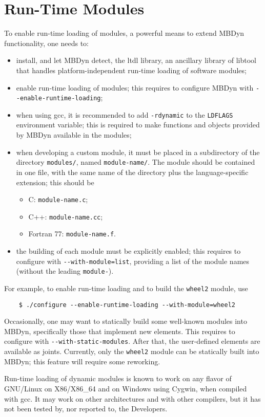 \documentclass[10pt,dvips]{report}
\newcommand{\kw}[1]{\texttt{#1}}
\begin{document}
\section{Run-Time Modules}
To enable run-time loading of modules, a powerful means to extend
MBDyn functionality, one needs to:
\begin{itemize}
\item install, and let MBDyn detect, the ltdl library, an ancillary
library of libtool that handles platform-independent run-time loading
of software modules;
\item enable run-time loading of modules; this requires to configure
MBDyn with \kw{{-}{-}enable-runtime-loading};
\item when using gcc, it is recommended to add \kw{-rdynamic} to
the \kw{LDFLAGS} environment variable; this is required to make
functions and objects provided by MBDyn available in the modules;
\item when developing a custom module, it must be placed in a subdirectory
of the directory \kw{modules/}, named \kw{module-name/}.
The module should be contained in one file, with the same name
of the directory plus the language-specific extension; this should be
	\begin{itemize}
	\item C: \kw{module-name.c};
	\item C++: \kw{module-name.cc};
	\item Fortran 77: \kw{module-name.f}.
\end{itemize}
\item the building of each module must be explicitly enabled;
this requires to configure with \kw{{-}{-}with-module=list},
providing a list of the module names (without the leading \kw{module-}).
\end{itemize}
For example, to enable run-time loading and to build the \kw{wheel2} module,
use
\begin{verbatim}
    $ ./configure --enable-runtime-loading --with-module=wheel2
\end{verbatim}
Occasionally, one may want to statically build some well-known modules
into MBDyn, specifically those that implement new elements.
This requires to configure with \kw{{-}{-}with-static-modules}.
After that, the user-defined elements are available as joints.
Currently, only the \kw{wheel2} module can be statically built
into MBDyn; this feature will require some reworking.

Run-time loading of dynamic modules is known to work on any flavor
of GNU/Linux on X86/X86\_64 and on Windows using Cygwin, when compiled
with gcc.
It may work on other architectures and with other compilers, but it has
not been tested by, nor reported to, the Developers.
\end{document}
